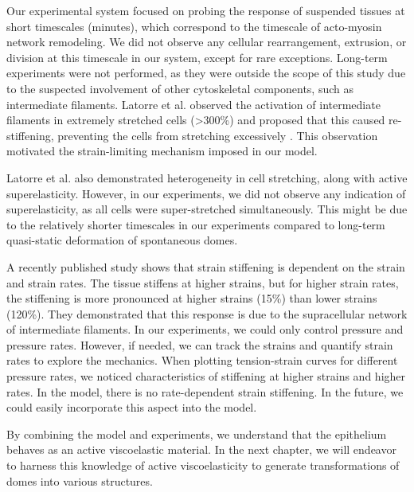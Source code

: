 Our experimental system focused on probing the response of suspended
tissues at short timescales (minutes), which correspond to the timescale
of acto-myosin network remodeling. We did not observe any cellular
rearrangement, extrusion, or division at this timescale in our system,
except for rare exceptions. Long-term experiments were not performed, as
they were outside the scope of this study due to the suspected
involvement of other cytoskeletal components, such as intermediate
filaments. Latorre et al. observed the activation of intermediate
filaments in extremely stretched cells (\textgreater300\%) and proposed
that this caused re-stiffening, preventing the cells from stretching
excessively \cite{latorre2018}. This observation motivated the strain-limiting mechanism
imposed in our model.

Latorre et al. also demonstrated heterogeneity in cell stretching, along
with active superelasticity. However, in our experiments, we did not
observe any indication of superelasticity, as all cells were
super-stretched simultaneously. This might be due to the relatively
shorter timescales in our experiments compared to long-term quasi-static
deformation of spontaneous domes.

A recently published study \cite{duque2023} shows that strain
stiffening is dependent on the strain and strain rates. The tissue
stiffens at higher strains, but for higher strain rates, the stiffening
is more pronounced at higher strains (15\%) than lower strains (120\%).
They demonstrated that this response is due to the supracellular network
of intermediate filaments. In our experiments, we could only control
pressure and pressure rates. However, if needed, we can track the
strains and quantify strain rates to explore the mechanics. When
plotting tension-strain curves for different pressure rates, we noticed
characteristics of stiffening at higher strains and higher rates. In the
model, there is no rate-dependent strain stiffening. In the future, we
could easily incorporate this aspect into the model.

By combining the model and experiments, we understand that the
epithelium behaves as an active viscoelastic material. In the next
chapter, we will endeavor to harness this knowledge of active
viscoelasticity to generate transformations of domes into various
structures.
